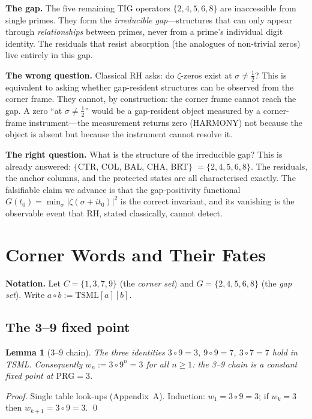 \documentclass[11pt]{article}
\newtheorem{lemma}{Lemma}
\begin{document}
\medskip\noindent\textbf{The gap.}
The five remaining TIG operators $\{2,4,5,6,8\}$ are inaccessible
from single primes.
They form the \emph{irreducible gap}---structures that can only
appear through \emph{relationships} between primes, never from a
prime's individual digit identity.
The residuals that resist absorption (the analogues of non-trivial
zeros) live entirely in this gap.

\medskip\noindent\textbf{The wrong question.}
Classical RH asks: do $\zeta$-zeros exist at $\sigma\ne\tfrac12$?
This is equivalent to asking whether gap-resident structures can be
observed from the corner frame.
They cannot, by construction: the corner frame cannot reach the gap.
A zero ``at $\sigma\ne\tfrac12$'' would be a gap-resident object
measured by a corner-frame instrument---the measurement returns
zero (HARMONY) not because the object is absent but because the
instrument cannot resolve it.

\medskip\noindent\textbf{The right question.}
What is the structure of the irreducible gap?
This is already answered: $\{$CTR, COL, BAL, CHA, BRT$\}$ $=\{2,4,5,6,8\}$.
The residuals, the anchor columns, and the protected states are all
characterised exactly.
The falsifiable claim we advance is that the gap-positivity
functional $G(t_0)=\min_\sigma|\zeta(\sigma+it_0)|^2$ is the
correct invariant, and its vanishing is the observable event that
RH, stated classically, cannot detect.

\section{Corner Words and Their Fates}

\noindent\textbf{Notation.}
Let $C=\{1,3,7,9\}$ (the \emph{corner set}) and $G=\{2,4,5,6,8\}$
(the \emph{gap set}).  Write $a\circ b:=\mathrm{TSML}[a][b]$.

\subsection{The 3--9 fixed point}

\begin{lemma}[3--9 chain]\label{lem:39}
The three identities $3\circ9=3$, $9\circ9=7$, $3\circ7=7$ hold in TSML.
Consequently $w_n:=3\circ9^n=3$ for all $n\ge1$:
the 3--9 chain is a constant fixed point at $\mathrm{PRG}=3$.
\end{lemma}

\begin{proof}
Single table look-ups (Appendix~A).
Induction: $w_1=3\circ9=3$; if $w_k=3$ then $w_{k+1}=3\circ9=3$. \qed
\end{proof}
\end{document}
